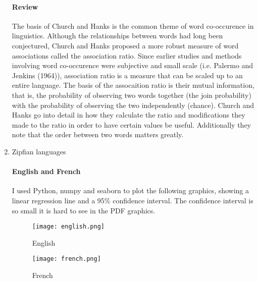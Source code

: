 \documentclass[12pt]{article}
\begin{document}
\begin{enumerate}
\paragraph{Review} The basis of Church and Hanks is the common theme of word co-occurence
        in linguistics. Although the relationships between words had long been conjectured,
        Church and Hanks proposed a more robust measure of word associations called the 
        association ratio. Since earlier studies and methods involving word co-occurence 
        were subjective and small scale (i.e. Palermo and Jenkins (1964)), association
        ratio is a measure that can be scaled up to an entire language. The basis of the
        assocaition ratio is their mutual information, that is, the probability of observing
        two words together (the join probability) with the probability of observing the two
        independently (chance). Church and Hanks go into detail in how they calculate the
        ratio and modifications they made to the ratio in order to have certain values be
        useful. Additionally they note that the order between two words matters greatly.

\item Zipfian languages
\paragraph{English and French} I used Python, numpy and seaborn to plot the following graphics,
        showing a linear regression line and a 95\% confidence interval. The confidence interval
        is so small it is hard to see in the PDF graphics.
        \begin{figure}[h]
            \caption{English}
            \centering
            \texttt{[image: english.png]}
        \end{figure}
        \begin{figure}[h]
            \caption{French}
            \centering
            \texttt{[image: french.png]}
        \end{figure}
\end{enumerate}
\end{document}
